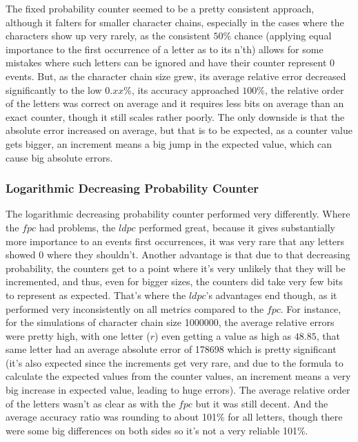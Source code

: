 \documentclass[...]{revdetua}
\begin{document}
The fixed probability counter seemed to be a pretty consistent approach, although it falters for smaller character chains, especially in the cases where the characters show up very rarely, as the consistent $50$\% chance (applying equal importance to the first occurrence of a letter as to its n'th) allows for some mistakes where such letters can be ignored and have their counter represent 0 events.
But, as the character chain size grew, its average relative error decreased significantly to the low $0.xx$\%, its accuracy approached $100$\%, the relative order of the letters was correct on average and it requires less bits on average than an exact counter, though it still scales rather poorly. The only downside is that the absolute error increased on average, but that is to be expected, as a counter value gets bigger, an increment means a big jump in the expected value, which can cause big absolute errors.	
\subsubsection{Logarithmic Decreasing Probability Counter}
The logarithmic decreasing probability counter performed very differently.
Where the $fpc$ had problems, the $ldpc$ performed great, because it gives substantially more importance to an events first occurrences, it was very rare that any letters showed 0 where they shouldn't. Another advantage is that due to that decreasing probability, the counters get to a point where it's very unlikely that they will be incremented, and thus, even for bigger sizes, the counters did take very few bits to represent as expected.
That's where the $ldpc$'s advantages end though, as it performed very inconsistently on all metrics  compared to the $fpc$.
For instance, for the simulations of character chain size 1000000, the average relative errors were pretty high, with one letter ($r$) even getting a value as high as $48.85$, that same letter had an average absolute error of 178698 which is pretty significant (it's also expected since the increments get very rare, and due to the formula to calculate the expected values from the counter values, an increment means a very big increase in expected value, leading to huge errors). The average relative order of the letters wasn't as clear as with the $fpc$ but it was still decent. And the average accuracy ratio was rounding to about 101\% for all letters, though there were some big differences on both sides so it's not a very reliable 101\%.
\end{document}
